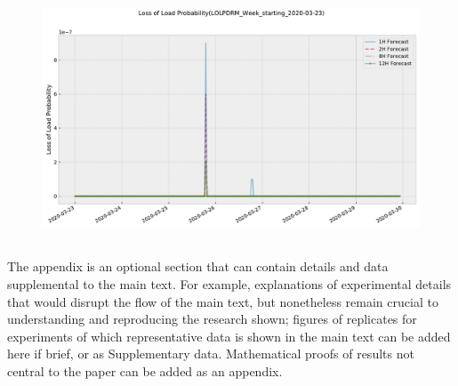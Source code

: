 \documentclass[energies,article,submit,moreauthors,pdftex]{Definitions/mdpi}
\begin{document}
\begin{figure}[H]\centering
\hspace{-25pt}\includegraphics[width=15 cm]{Graphics/LOLPDRM_Week_starting_2020-03-23no4H.pdf}
\caption{}\label{}
\end{figure}  



\unskip
\subsection{}
The appendix is an optional section that can contain details and data supplemental to the main text. For example, explanations of experimental details that would disrupt the flow of the main text, but nonetheless remain crucial to understanding and reproducing the research shown; figures of replicates for experiments of which representative data is shown in the main text can be added here if brief, or as Supplementary data. Mathematical proofs of results not central to the paper can be added as an appendix.








\end{document}
